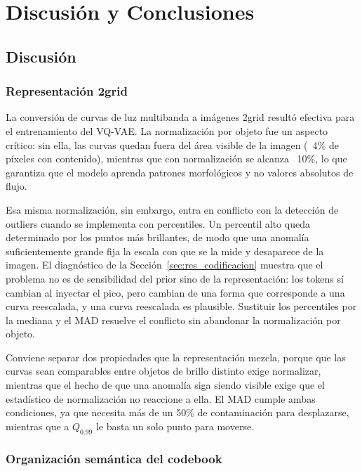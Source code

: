 \chapter{Discusión y Conclusiones}


\section{Discusión}

\subsection{Representación 2grid}

La conversión de curvas de luz multibanda a imágenes 2grid resultó efectiva para el entrenamiento del VQ-VAE. La normalización por objeto fue un aspecto crítico: sin ella, las curvas quedan fuera del área visible de la imagen (~4\% de píxeles con contenido), mientras que con normalización se alcanza ~10\%, lo que garantiza que el modelo aprenda patrones morfológicos y no valores absolutos de flujo.

Esa misma normalización, sin embargo, entra en conflicto con la detección de outliers cuando se implementa con percentiles. Un percentil alto queda determinado por los puntos más brillantes, de modo que una anomalía suficientemente grande fija la escala con que se la mide y desaparece de la imagen. El diagnóstico de la Sección~\ref{sec:res_codificacion} muestra que el problema no es de sensibilidad del prior sino de la representación: los tokens sí cambian al inyectar el pico, pero cambian de una forma que corresponde a una curva reescalada, y una curva reescalada es plausible. Sustituir los percentiles por la mediana y el MAD resuelve el conflicto sin abandonar la normalización por objeto.

Conviene separar dos propiedades que la representación mezcla, porque que las curvas sean comparables entre objetos de brillo distinto exige normalizar, mientras que el hecho de que una anomalía siga siendo visible exige que el estadístico de normalización no reaccione a ella. El MAD cumple ambas condiciones, ya que necesita más de un 50\% de contaminación para desplazarse, mientras que a $Q_{0.99}$ le basta un solo punto para moverse.

\subsection{Organización semántica del codebook}

